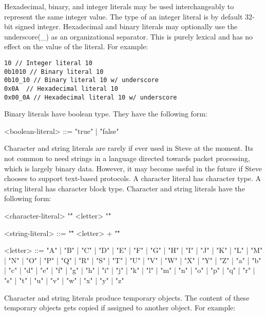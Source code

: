Hexadecimal, binary, and integer literals may be used interchangeably to represent the same integer value. The type of an integer literal is by default 32-bit signed integer. Hexadecimal and binary literals may optionally use the underscore(\_) as an organizational separator. This is purely lexical and has no effect on the value of the literal. For example:

\begin{minip}
\begin{lstlisting}
10 // Integer literal 10
0b1010 // Binary literal 10
0b10_10 // Binary literal 10 w/ underscore
0x0A  // Hexadecimal literal 10
0x00_0A // Hexadecimal literal 10 w/ underscore  
\end{lstlisting}
\end{minip}

Binary literals have boolean type. They have the following form:

\begin{minip}
\begin{grammar}
<boolean-literal> ::= "true" | "false"
\end{grammar}
\end{minip}

Character and string literals are rarely if ever used in Steve at the moment. Its not common to need strings in a language directed towards packet processing, which is largely binary data. However, it may become useful in the future if Steve chooses to support text-based protocols. A character literal has character type. A string literal has character block type. Character and string literals have the following form:

\begin{minip}
\begin{grammar}
<character-literal> "\'" <letter> "\'"

<string-literal> ::= "\"" <letter> + "\""

<letter> ::= "A" | "B" | "C" | "D" | "E" | "F" | "G"
       | "H" | "I" | "J" | "K" | "L" | "M" | "N"
       | "O" | "P" | "Q" | "R" | "S" | "T" | "U"
       | "V" | "W" | "X" | "Y" | "Z" | "a" | "b"
       | "c" | "d" | "e" | "f" | "g" | "h" | "i"
       | "j" | "k" | "l" | "m" | "n" | "o" | "p"
       | "q" | "r" | "s" | "t" | "u" | "v" | "w"
       | "x" | "y" | "z"
\end{grammar}
\end{minip}

Character and string literals produce temporary objects. The content of these temporary objects gets copied if assigned to another object. For example:


